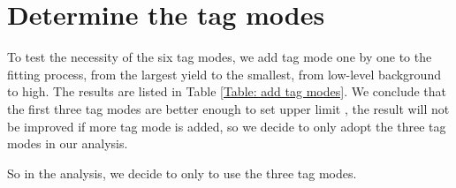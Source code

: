\section{Determine the tag modes}
To test the necessity of the six tag modes, we add tag mode one by one
to the fitting process, from the largest yield to the smallest, from
low-level background to high. The results are listed in Table
\ref{Table: add tag modes}. We conclude that the first three tag modes
are better enough to set upper limit
\cite{Lees:2011qz,Ablikim:2015djc,Ablikim:2017twd}, the result will not
be improved if more tag mode is added, so we decide to only adopt the
three tag modes in our analysis.

\begin{table}[htbp]
    \caption{" $\surd$ "~ means this tag mode is added in the simultaneous fit.}
    \label{Table: add tag modes}
\end{table}

So in the analysis, we decide to only to use the three tag modes.
